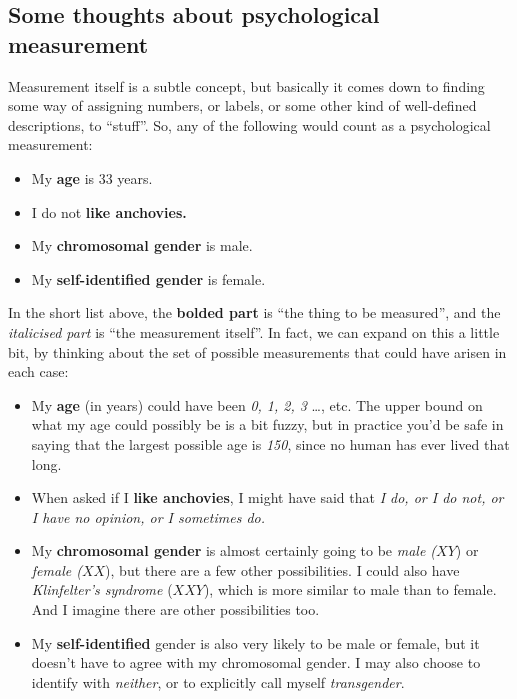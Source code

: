\documentclass[
]{book}
\providecommand{\tightlist}{%
  \setlength{\itemsep}{0pt}\setlength{\parskip}{0pt}}
\begin{document}
\hypertarget{some-thoughts-about-psychological-measurement}{%
\subsection{Some thoughts about psychological measurement}\label{some-thoughts-about-psychological-measurement}}

Measurement itself is a subtle concept, but basically it comes down to finding some way of assigning numbers, or labels, or some other kind of well-defined descriptions, to ``stuff''. So, any of the following would count as a psychological measurement:

\begin{itemize}
\tightlist
\item
  My \textbf{age} is 33 years.
\item
  I do not \textbf{like anchovies.}
\item
  My \textbf{chromosomal gender} is male.
\item
  My \textbf{self-identified gender} is female.
\end{itemize}

In the short list above, the \textbf{bolded part} is ``the thing to be measured'', and the \emph{italicised part} is ``the measurement itself''. In fact, we can expand on this a little bit, by thinking about the set of possible measurements that could have arisen in each case:

\begin{itemize}
\tightlist
\item
  My \textbf{age} (in years) could have been \emph{0, 1, 2, 3} \ldots, etc. The upper bound on what my age could possibly be is a bit fuzzy, but in practice you'd be safe in saying that the largest possible age is \emph{150}, since no human has ever lived that long.
\item
  When asked if I \textbf{like anchovies}, I might have said that \emph{I do, or I do not, or I have no opinion, or I sometimes do.}
\item
  My \textbf{chromosomal gender} is almost certainly going to be \emph{male (}\(XY\)) or \emph{female (}\(XX\)), but there are a few other possibilities. I could also have \emph{Klinfelter's syndrome} (\(XXY\)), which is more similar to male than to female. And I imagine there are other possibilities too.
\item
  My \textbf{self-identified} gender is also very likely to be male or female, but it doesn't have to agree with my chromosomal gender. I may also choose to identify with \emph{neither}, or to explicitly call myself \emph{transgender}.
\end{itemize}
\end{document}
